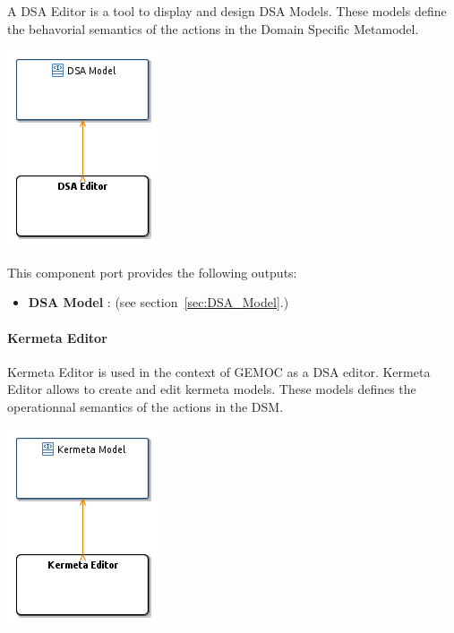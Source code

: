\documentclass{gemoc} %
\begin{document}
A DSA Editor is a tool to display and design DSA Models.
These models define the behavorial semantics of the actions in the Domain Specific Metamodel.
\begin{center}
\includegraphics*[trim=0.0cm 0.0cm 0cm 0.0cm, clip=true]{../images/generated/Generated_DSA_Editor.png}
\end{center}


This component port provides the following outputs:
\begin{itemize}
  \item \textbf{DSA Model} :
(see section~\ref{sec:DSA_Model}.)
\end{itemize}

\paragraph{Kermeta Editor}
\label{sec:Kermeta_Editor}
Kermeta Editor is used in the context of GEMOC as a DSA editor.
Kermeta Editor allows to create and edit kermeta models. These models defines the operationnal semantics of the actions in the DSM.
\begin{center}
\includegraphics*[trim=0.0cm 0.0cm 0cm 0.0cm, clip=true]{../images/generated/Generated_Kermeta_Editor.png}
\end{center}
\end{document}

